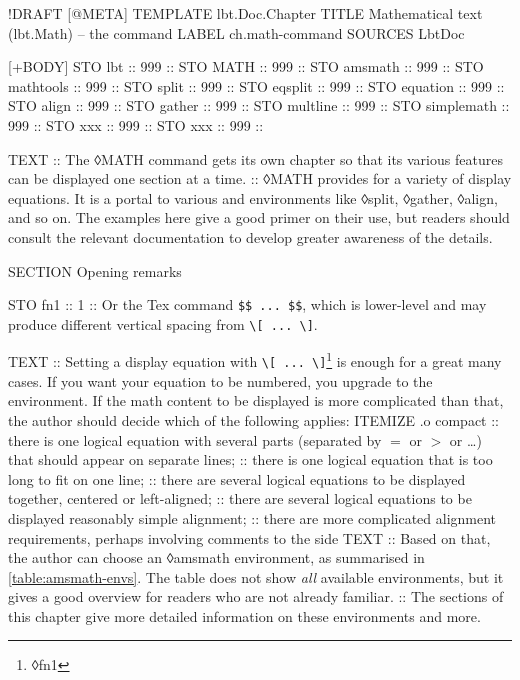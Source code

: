 \begin{lbt}
  !DRAFT
  [@META]
    TEMPLATE lbt.Doc.Chapter
    TITLE Mathematical text \textsf{(lbt.Math)} -- the  command
    LABEL ch.math-command
    SOURCES LbtDoc

  [+BODY]
    STO lbt :: 999 :: \lbtlogo{}
    STO MATH :: 999 :: 
    STO amsmath :: 999 :: 
    STO mathtools :: 999 :: 
    STO split :: 999 :: 
    STO eqsplit :: 999 :: 
    STO equation :: 999 :: 
    STO align :: 999 :: 
    STO gather :: 999 :: 
    STO multline :: 999 :: 
    STO simplemath :: 999 :: 
    STO xxx :: 999 :: 
    STO xxx :: 999 :: 

    TEXT
    :: The ◊MATH command gets its own chapter so that its various features can be displayed one section at a time.
    :: ◊MATH provides for a variety of display equations. It is a portal to various  and  environments like ◊split, ◊gather, ◊align, and so on. The examples here give a good primer on their use, but readers should consult the relevant documentation to develop greater awareness of the details.

    SECTION Opening remarks

    STO fn1 :: 1 :: Or the Tex command \Verb|$$ ... $$|, which is lower-level and may produce different vertical spacing from \Verb|\[ ... \]|.

    TEXT
    :: Setting a display equation with \Verb|\[ ... \]|\footnote{◊fn1} is enough for a great many cases. If you want your equation to be numbered, you upgrade to the  environment. If the math content to be displayed is more complicated than that, the author should decide which of the following applies:
    ITEMIZE .o compact
    :: there is one logical equation with several parts (separated by $=$ or $>$ or \dots) that should appear on separate lines;
    :: there is one logical equation that is too long to fit on one line;
    :: there are several logical equations to be displayed together, centered or left-aligned;
    :: there are several logical equations to be displayed reasonably simple alignment;
    :: there are more complicated alignment requirements, perhaps involving comments to the side
    TEXT
    :: Based on that, the author can choose an ◊amsmath environment, as summarised in \cref{table:amsmath-envs}. The table does not show \emph{all} available environments, but it gives a good overview for readers who are not already familiar.
    :: The sections of this chapter give more detailed information on these environments and more.


\end{lbt}
